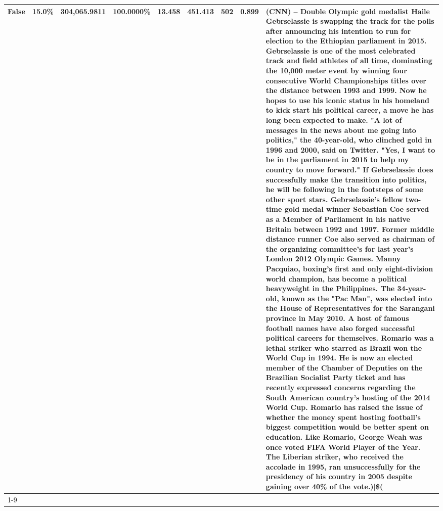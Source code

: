 \begin{table}[H]
{\begin{tabular}{lllrlllll}
False & 15.0\% & 304,065.9811 & \bfseries \color{red} 100.0000\% & 13.458 & 451.413 & 502 & 0.899 & (CNN) -- Double Olympic gold medalist Haile Gebrselassie is swapping the track for the polls after announcing his intention to run for election to the Ethiopian parliament in 2015. Gebrselassie is one of the most celebrated track and field athletes of all time, dominating the 10,000 meter event by winning four consecutive World Championships titles over the distance between 1993 and 1999. Now he hopes to use his iconic status in his homeland to kick start his political career, a move he has long been expected to make. "A lot of messages in the news about me going into politics," the 40-year-old, who clinched gold in 1996 and 2000, said on Twitter. "Yes, I want to be in the parliament in 2015 to help my country to move forward." If Gebrselassie does successfully make the transition into politics, he will be following in the footsteps of some other sport stars. Gebrselassie's fellow two-time gold medal winner Sebastian Coe served as a Member of Parliament in his native Britain between 1992 and 1997. Former middle distance runner Coe also served as chairman of the organizing committee's for last year's London 2012 Olympic Games. Manny Pacquiao, boxing's first and only eight-division world champion, has become a political heavyweight in the Philippines. The 34-year-old, known as the "Pac Man", was elected into the House of Representatives for the Sarangani province in May 2010. A host of famous football names have also forged successful political careers for themselves. Romario was a lethal striker who starred as Brazil won the World Cup in 1994. He is now an elected member of the Chamber of Deputies on the Brazilian Socialist Party ticket and has recently expressed concerns regarding the South American country's hosting of the 2014 World Cup. Romario has raised the issue of whether the money spent hosting football's biggest competition would be better spent on education. Like Romario, George Weah was once voted FIFA World Player of the Year. The Liberian striker, who received the accolade in 1995, ran unsuccessfully for the presidency of his country in 2005 despite gaining over 40\% of the vote.)|\$( \\
\cline{1-9}

\end{tabular}}
\end{table}
